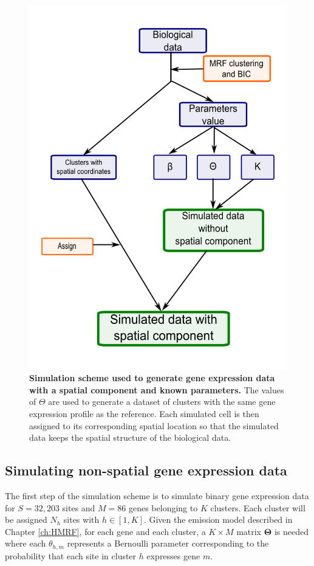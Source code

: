 	\begin{figure}[H]
\centerline{\includegraphics[width=0.8\linewidth]{gfx/chapter5/simulation_scheme.png}}
\caption{{\bf Simulation scheme used to generate gene expression data with a spatial component and known parameters.} The values of $\Theta$ are used to generate a dataset of clusters with the same gene expression profile as the reference. Each simulated cell is then assigned to its corresponding spatial location so that the simulated data keeps the spatial structure of the biological data.}
\label{fig:simulationScheme}
	\end{figure}
	
	\subsection{Simulating non-spatial gene expression data}\label{subsec:simul_non_spatial}
	The first step of the simulation scheme is to simulate binary gene expression data for $S=32,203$ sites and $M=86$ genes belonging to $K$ clusters. Each cluster will be assigned $N_h$ sites with $h \in [1,K]$. Given the emission model described in Chapter \ref{ch:HMRF}, for each gene and each cluster, a $K \times M$ matrix $\boldsymbol{\Theta}$ is needed where each $\theta_{h,m}$ represents a Bernoulli parameter corresponding to the probability that each site in cluster $h$ expresses gene $m$.\\
	
